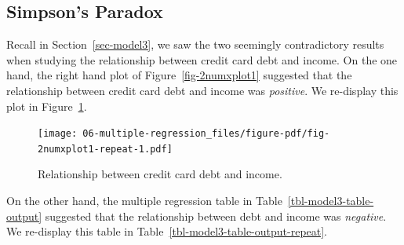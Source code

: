 \documentclass[
  letterpaper,
  DIV=11,
  numbers=noendperiod]{scrreprt}
\theoremstyle{definition}
\theoremstyle{remark}
\begin{document}
\hypertarget{sec-simpsonsparadox}{%
\subsection{Simpson's Paradox}\label{sec-simpsonsparadox}}

Recall in Section~\ref{sec-model3}, we saw the two seemingly
contradictory results when studying the relationship between credit card
debt and income. On the one hand, the right hand plot of
Figure~\ref{fig-2numxplot1} suggested that the relationship between
credit card debt and income was \emph{positive}. We re-display this plot
in Figure~\ref{fig-2numxplot1-repeat}.

\begin{figure}

{\centering \texttt{[image: 06-multiple-regression\_files/figure-pdf/fig-2numxplot1-repeat-1.pdf]}

}

\caption{\label{fig-2numxplot1-repeat}Relationship between credit card
debt and income.}

\end{figure}

On the other hand, the multiple regression table in
Table~\ref{tbl-model3-table-output} suggested that the relationship
between debt and income was \emph{negative}. We re-display this table in
Table~\ref{tbl-model3-table-output-repeat}.
\end{document}
